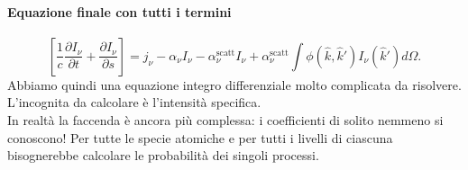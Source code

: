 \paragraph{Equazione finale con tutti i termini}%
\[
	\left[ \frac{1}{c}\frac{\partial I_{\nu}}{\partial t} + \frac{\partial I_{\nu}}{\partial s}  \right] =
	j _{\nu} 
	- \alpha_{\nu}I_{\nu} 
	- \alpha_{\nu}^{\text{scatt}}I_{\nu} 
	+ \alpha_{\nu}^{\text{scatt}} \int\phi\left( \hat{k},\hat{k}' \right) I_{\nu}\left( \hat{k}' \right) d\Omega
.\] 
Abbiamo quindi una equazione integro differenziale molto complicata da risolvere. L'incognita da calcolare è l'intensità specifica.\\
In realtà la faccenda è ancora più  complessa: i coefficienti di solito nemmeno si conoscono! Per tutte le specie atomiche e per tutti i livelli di ciascuna bisognerebbe calcolare le probabilità dei singoli processi.

